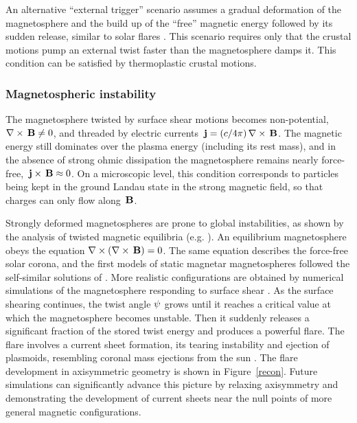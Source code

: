 An alternative ``external trigger'' scenario assumes a gradual deformation of the 
magnetosphere and the build up of the ``free'' magnetic energy followed by its 
sudden release, similar to solar flares \citep{lyu03,gh10,pbh13}.
This scenario requires only that the crustal motions pump an external twist 
faster than the magnetosphere damps it. This condition 
can be satisfied by thermoplastic crustal motions.


\subsubsection{Magnetospheric instability}


The magnetosphere twisted by surface shear motions becomes non-potential, 
$\nabla\times{\,\mathbf B}\neq 0$, and threaded by electric currents ${\,\mathbf j}=(c/4\pi)\,\nabla\times{\,\mathbf B}$.
The magnetic energy still dominates over the plasma energy (including its rest mass),
and in the absence of strong ohmic dissipation the magnetosphere remains nearly 
force-free, ${\,\mathbf j}\times{\,\mathbf B}\approx 0$.
On a microscopic level, this condition corresponds to 
particles being kept in the ground Landau state in the strong magnetic field,
so that charges can only flow along ${\,\mathbf B}$.

Strongly deformed magnetospheres are prone to global instabilities, 
as shown by the analysis of twisted magnetic equilibria (e.g. \citet{uzd02}).
An equilibrium magnetosphere obeys the 
equation $\nabla\times(\nabla\times{\,\mathbf B})=0$. The same equation describes the 
force-free solar corona, and
the first models of static magnetar 
magnetospheres  \citep{tlk02} followed the self-similar solutions of \citet{wol95a}.
More realistic configurations are obtained by numerical simulations
of the magnetosphere responding to surface shear \citep{pbh13}.
As the surface shearing continues, the twist angle $\psi$ grows until it reaches 
a critical value at which the magnetosphere becomes unstable.
Then it suddenly releases a significant fraction of the stored twist energy and 
produces a powerful flare. 
The flare involves a current sheet formation, its tearing instability and ejection of 
plasmoids, resembling coronal mass ejections from the sun \citep{ml94a}.
The flare development in axisymmetric geometry is shown in Figure~\ref{recon}.
Future simulations can significantly advance this picture
by relaxing axisymmetry and demonstrating the 
development of current sheets near the null points of more general magnetic configurations.

